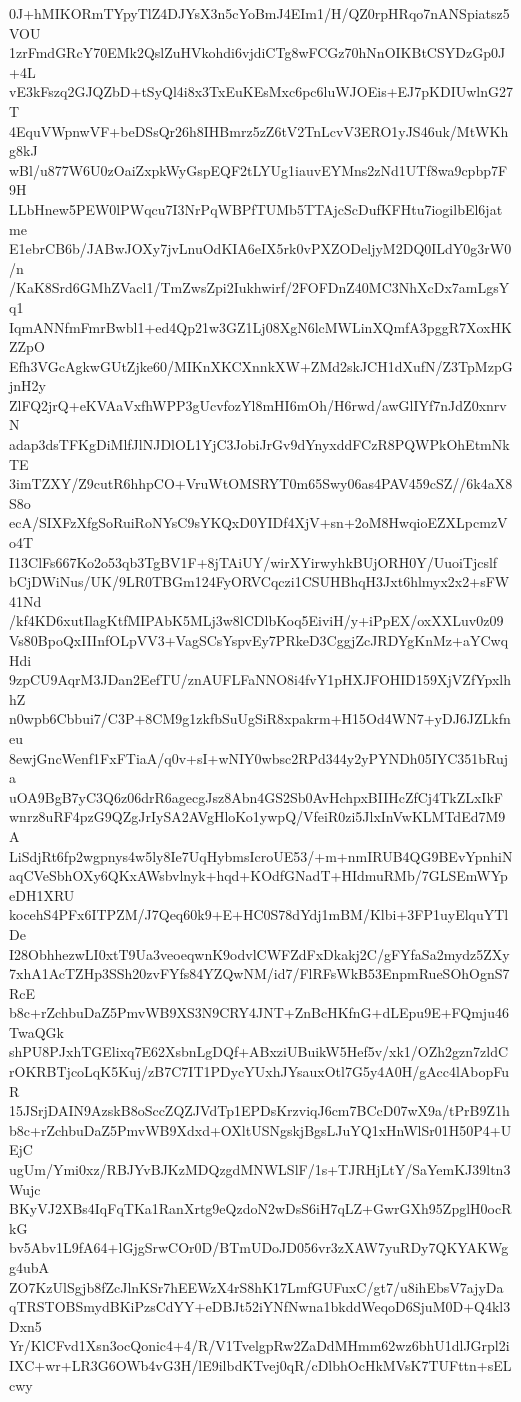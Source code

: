 0J+hMIKORmTYpyTlZ4DJYsX3n5cYoBmJ4EIm1/H/QZ0rpHRqo7nANSpiatsz5VOU
1zrFmdGRcY70EMk2QslZuHVkohdi6vjdiCTg8wFCGz70hNnOIKBtCSYDzGp0J+4L
vE3kFszq2GJQZbD+tSyQl4i8x3TxEuKEsMxc6pc6luWJOEis+EJ7pKDIUwlnG27T
4EquVWpnwVF+beDSsQr26h8IHBmrz5zZ6tV2TnLcvV3ERO1yJS46uk/MtWKhg8kJ
wBl/u877W6U0zOaiZxpkWyGspEQF2tLYUg1iauvEYMns2zNd1UTf8wa9cpbp7F9H
LLbHnew5PEW0lPWqcu7I3NrPqWBPfTUMb5TTAjcScDufKFHtu7iogilbEl6jatme
E1ebrCB6b/JABwJOXy7jvLnuOdKIA6eIX5rk0vPXZODeljyM2DQ0ILdY0g3rW0/n
/KaK8Srd6GMhZVacl1/TmZwsZpi2Iukhwirf/2FOFDnZ40MC3NhXcDx7amLgsYq1
IqmANNfmFmrBwbl1+ed4Qp21w3GZ1Lj08XgN6lcMWLinXQmfA3pggR7XoxHKZZpO
Efh3VGcAgkwGUtZjke60/MIKnXKCXnnkXW+ZMd2skJCH1dXufN/Z3TpMzpGjnH2y
ZlFQ2jrQ+eKVAaVxfhWPP3gUcvfozYl8mHI6mOh/H6rwd/awGlIYf7nJdZ0xnrvN
adap3dsTFKgDiMlfJlNJDlOL1YjC3JobiJrGv9dYnyxddFCzR8PQWPkOhEtmNkTE
3imTZXY/Z9cutR6hhpCO+VruWtOMSRYT0m65Swy06as4PAV459cSZ//6k4aX8S8o
ecA/SIXFzXfgSoRuiRoNYsC9sYKQxD0YIDf4XjV+sn+2oM8HwqioEZXLpcmzVo4T
I13ClFs667Ko2o53qb3TgBV1F+8jTAiUY/wirXYirwyhkBUjORH0Y/UuoiTjcslf
bCjDWiNus/UK/9LR0TBGm124FyORVCqczi1CSUHBhqH3Jxt6hlmyx2x2+sFW41Nd
/kf4KD6xutIlagKtfMIPAbK5MLj3w8lCDlbKoq5EiviH/y+iPpEX/oxXXLuv0z09
Vs80BpoQxIIInfOLpVV3+VagSCsYspvEy7PRkeD3CggjZcJRDYgKnMz+aYCwqHdi
9zpCU9AqrM3JDan2EefTU/znAUFLFaNNO8i4fvY1pHXJFOHID159XjVZfYpxlhhZ
n0wpb6Cbbui7/C3P+8CM9g1zkfbSuUgSiR8xpakrm+H15Od4WN7+yDJ6JZLkfneu
8ewjGncWenf1FxFTiaA/q0v+sI+wNIY0wbsc2RPd344y2yPYNDh05IYC351bRuja
uOA9BgB7yC3Q6z06drR6agecgJsz8Abn4GS2Sb0AvHchpxBIIHcZfCj4TkZLxIkF
wnrz8uRF4pzG9QZgJrIySA2AVgHloKo1ywpQ/VfeiR0zi5JlxInVwKLMTdEd7M9A
LiSdjRt6fp2wgpnys4w5ly8Ie7UqHybmsIcroUE53/+m+nmIRUB4QG9BEvYpnhiN
aqCVeSbhOXy6QKxAWsbvlnyk+hqd+KOdfGNadT+HIdmuRMb/7GLSEmWYpeDH1XRU
kocehS4PFx6ITPZM/J7Qeq60k9+E+HC0S78dYdj1mBM/Klbi+3FP1uyElquYTlDe
I28ObhhezwLI0xtT9Ua3veoeqwnK9odvlCWFZdFxDkakj2C/gFYfaSa2mydz5ZXy
7xhA1AcTZHp3SSh20zvFYfs84YZQwNM/id7/FlRFsWkB53EnpmRueSOhOgnS7RcE
b8c+rZchbuDaZ5PmvWB9XS3N9CRY4JNT+ZnBcHKfnG+dLEpu9E+FQmju46TwaQGk
shPU8PJxhTGElixq7E62XsbnLgDQf+ABxziUBuikW5Hef5v/xk1/OZh2gzn7zldC
rOKRBTjcoLqK5Kuj/zB7C7IT1PDycYUxhJYsauxOtl7G5y4A0H/gAcc4lAbopFuR
15JSrjDAIN9AzskB8oSccZQZJVdTp1EPDsKrzviqJ6cm7BCcD07wX9a/tPrB9Z1h
b8c+rZchbuDaZ5PmvWB9Xdxd+OXltUSNgskjBgsLJuYQ1xHnWlSr01H50P4+UEjC
ugUm/Ymi0xz/RBJYvBJKzMDQzgdMNWLSlF/1s+TJRHjLtY/SaYemKJ39ltn3Wujc
BKyVJ2XBs4IqFqTKa1RanXrtg9eQzdoN2wDsS6iH7qLZ+GwrGXh95ZpglH0ocRkG
bv5Abv1L9fA64+lGjgSrwCOr0D/BTmUDoJD056vr3zXAW7yuRDy7QKYAKWgg4ubA
ZO7KzUlSgjb8fZcJlnKSr7hEEWzX4rS8hK17LmfGUFuxC/gt7/u8ihEbsV7ajyDa
qTRSTOBSmydBKiPzsCdYY+eDBJt52iYNfNwna1bkddWeqoD6SjuM0D+Q4kl3Dxn5
Yr/KlCFvd1Xsn3ocQonic4+4/R/V1TvelgpRw2ZaDdMHmm62wz6bhU1dlJGrpl2i
IXC+wr+LR3G6OWb4vG3H/lE9ilbdKTvej0qR/cDlbhOcHkMVsK7TUFttn+sELcwy
